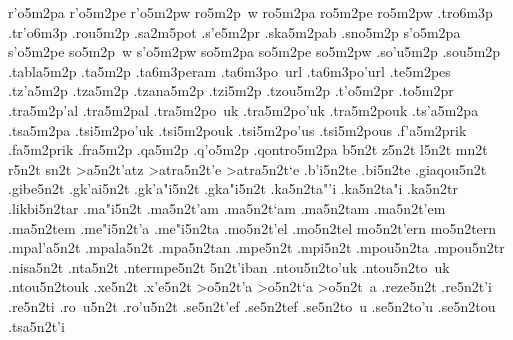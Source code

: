 {r'o5m2pa     %
r'o5m2pe
r'o5m2pw
ro5m2p~w
ro5m2pa
ro5m2pe
ro5m2pw
  .tro6m3p	 %
  .tr'o6m3p      %
.rou5m2p     %
.sa2m5pot    %
.s'e5m2pr    %
.ska5m2pab   %
.sno5m2p     %
s'o5m2pa     %
s'o5m2pe
so5m2p~w
s'o5m2pw
so5m2pa
so5m2pe
so5m2pw
.so'u5m2p    %
.sou5m2p
.tabla5m2p   %
.ta5m2p      %
  .ta6m3peram  %
  .ta6m3po~url %
  .ta6m3po'url
.te5m2pes    %
.tz'a5m2p    %
.tza5m2p
.tzana5m2p   %
.tzi5m2p     %
.tzou5m2p    %
.t'o5m2pr    %
.to5m2pr
.tra5m2p'al  %
.tra5m2pal
.tra5m2po~uk %
.tra5m2po'uk
.tra5m2pouk
.ts'a5m2pa   %
.tsa5m2pa
.tsi5m2po'uk %
.tsi5m2pouk
.tsi5m2po'us %
.tsi5m2pous
.f'a5m2prik  %
.fa5m2prik
.fra5m2p     %
.qa5m2p      %
.q'o5m2p     %
.qontro5m2pa %
b5n2t
z5n2t
l5n2t
mn2t
r5n2t
sn2t
>a5n2t'atz   %
>atra5n2t'e  %
>atra5n2t`e
.b'i5n2te    %
.bi5n2te
.giaqou5n2t  %
.gibe5n2t    %
.gk'ai5n2t   %
.gk'a"i5n2t
.gka"i5n2t
.ka5n2ta"'i  %
.ka5n2ta"i
.ka5n2tr     %
.likbi5n2tar %
.ma"i5n2t    %
.ma5n2t'am   %
.ma5n2t`am
.ma5n2tam
.ma5n2t'em   %
.ma5n2tem
.me"i5n2t'a  %
.me"i5n2ta
.mo5n2t'el   %
.mo5n2tel
mo5n2t'ern   %
mo5n2tern
.mpal'a5n2t  %
.mpala5n2t
.mpa5n2tan   %
.mpe5n2t     %
.mpi5n2t     %
.mpou5n2ta   %
.mpou5n2tr   %
.nisa5n2t    %
.nta5n2t     %
.ntermpe5n2t %
5n2t'iban    %
.ntou5n2to'uk %
.ntou5n2to~uk
.ntou5n2touk
.xe5n2t      %
.x'e5n2t
>o5n2t'a     %
>o5n2t`a
>o5n2t~a
.reze5n2t    %
.re5n2t'i    %
.re5n2ti
.ro~u5n2t    %
.ro'u5n2t
.se5n2t'ef   %
.se5n2tef
.se5n2to~u   %
.se5n2to'u
.se5n2tou
.tsa5n2t'i   %
}
